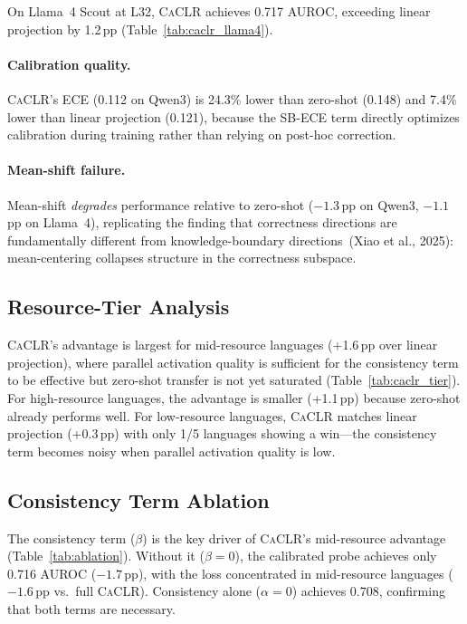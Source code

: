 \documentclass[11pt,a4paper]{article}
\newcommand{\caclr}{\textsc{CaCLR}}
\newcommand{\sbece}{SB-ECE}
\begin{document}
On Llama~4 Scout at L32, \caclr{} achieves 0.717 AUROC, exceeding linear projection by 1.2\,pp (Table~\ref{tab:caclr_llama4}).

\paragraph{Calibration quality.}
\caclr{}'s ECE (0.112 on Qwen3) is 24.3\% lower than zero-shot (0.148) and 7.4\% lower than linear projection (0.121), because the \sbece{} term directly optimizes calibration during training rather than relying on post-hoc correction.

\paragraph{Mean-shift failure.}
Mean-shift \emph{degrades} performance relative to zero-shot ($-1.3$\,pp on Qwen3, $-1.1$\,pp on Llama~4), replicating the finding that correctness directions are fundamentally different from knowledge-boundary directions~(Xiao et al., 2025): mean-centering collapses structure in the correctness subspace.

\subsection{Resource-Tier Analysis}

\caclr{}'s advantage is largest for mid-resource languages (+1.6\,pp over linear projection), where parallel activation quality is sufficient for the consistency term to be effective but zero-shot transfer is not yet saturated (Table~\ref{tab:caclr_tier}).
For high-resource languages, the advantage is smaller (+1.1\,pp) because zero-shot already performs well.
For low-resource languages, \caclr{} matches linear projection (+0.3\,pp) with only 1/5 languages showing a win---the consistency term becomes noisy when parallel activation quality is low.

\subsection{Consistency Term Ablation}

The consistency term ($\beta$) is the key driver of \caclr{}'s mid-resource advantage (Table~\ref{tab:ablation}).
Without it ($\beta = 0$), the calibrated probe achieves only 0.716 AUROC ($-1.7$\,pp), with the loss concentrated in mid-resource languages ($-1.6$\,pp vs.\ full \caclr{}).
Consistency alone ($\alpha = 0$) achieves 0.708, confirming that both terms are necessary.
\end{document}
